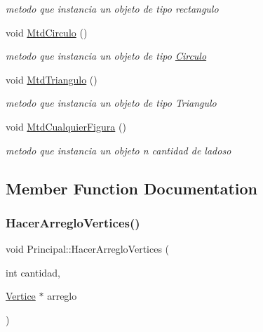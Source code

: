 \begin{DoxyCompactItemize}
\begin{DoxyCompactList}\small\item\em metodo que instancia un objeto de tipo rectangulo \end{DoxyCompactList}\item 
\mbox{\label{class_principal_a8711ee7dd8bb46d4014a6d27275ea104}} 
void \hyperlink{class_principal_a8711ee7dd8bb46d4014a6d27275ea104}{Mtd\+Circulo} ()
\begin{DoxyCompactList}\small\item\em metodo que instancia un objeto de tipo \hyperlink{class_circulo}{Circulo} \end{DoxyCompactList}\item 
\mbox{\label{class_principal_afc5a6c41795be6c9c29e4be5c4188322}} 
void \hyperlink{class_principal_afc5a6c41795be6c9c29e4be5c4188322}{Mtd\+Triangulo} ()
\begin{DoxyCompactList}\small\item\em metodo que instancia un objeto de tipo Triangulo \end{DoxyCompactList}\item 
\mbox{\label{class_principal_a3eda271bf0f7f3cc694dd0d6b7a6bc0d}} 
void \hyperlink{class_principal_a3eda271bf0f7f3cc694dd0d6b7a6bc0d}{Mtd\+Cualquier\+Figura} ()
\begin{DoxyCompactList}\small\item\em metodo que instancia un objeto n cantidad de ladoso \end{DoxyCompactList}\end{DoxyCompactItemize}


\subsection{Member Function Documentation}
\mbox{\label{class_principal_aca941b071da80e6d5202010165950101}} 
\subsubsection{\texorpdfstring{Hacer\+Arreglo\+Vertices()}{HacerArregloVertices()}}
{\footnotesize\ttfamily void Principal\+::\+Hacer\+Arreglo\+Vertices (\begin{DoxyParamCaption}\item[{int}]{cantidad,  }\item[{\hyperlink{class_vertice}{Vertice} $\ast$}]{arreglo }\end{DoxyParamCaption})\hspace{0.3cm}{\ttfamily [inline]}}



